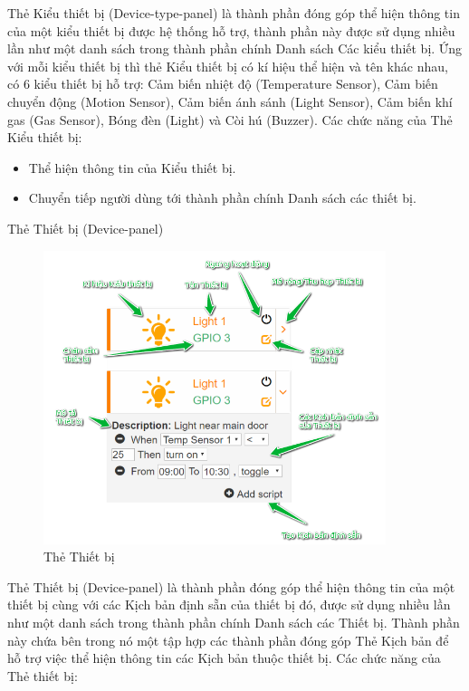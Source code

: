 \documentclass[11pt,a4paper,oneside]{book}
\begin{document}
Thẻ Kiểu thiết bị (Device-type-panel) là thành phần đóng góp thể hiện thông tin của một kiểu thiết bị được hệ thống hỗ trợ, thành phần này được sử dụng nhiều lần như một danh sách trong thành phần chính Danh sách Các kiểu thiết bị. Ứng với mỗi kiểu thiết bị thì thẻ Kiểu thiết bị có kí hiệu thể hiện và tên khác nhau, có 6 kiểu thiết bị hỗ trợ: Cảm biến nhiệt độ (Temperature Sensor), Cảm biến chuyển động (Motion Sensor), Cảm biến ánh sánh (Light Sensor), Cảm biến khí gas (Gas Sensor), Bóng đèn (Light) và Còi hú (Buzzer). Các chức năng của Thẻ Kiểu thiết bị:

\begin{itemize}[topsep=1mm,itemsep=-0.5mm]
\item Thể hiện thông tin của Kiểu thiết bị.
\item Chuyển tiếp người dùng tới thành phần chính Danh sách các thiết bị.
\vspace{1mm}
\end{itemize}

Thẻ Thiết bị (Device-panel)

\begin{figure}[h]
  \centering
     \includegraphics[width=10cm]{6-device-panel}
  \caption{Thẻ Thiết bị}\label{fig:6-device-panel}
\end{figure}

Thẻ Thiết bị (Device-panel) là thành phần đóng góp thể hiện thông tin của một thiết bị cùng với các Kịch bản định sẵn của thiết bị đó, được sử dụng nhiều lần như một danh sách trong thành phần chính Danh sách các Thiết bị. Thành phần này chứa bên trong nó một tập hợp các thành phần đóng góp Thẻ Kịch bản để hỗ trợ việc thể hiện thông tin các Kịch bản thuộc thiết bị. Các chức năng của Thẻ thiết bị:
\end{document}
